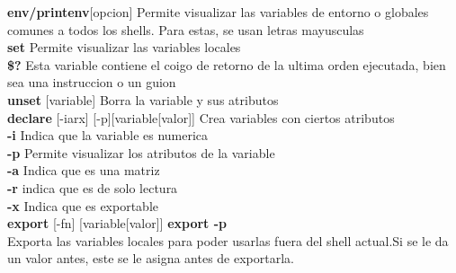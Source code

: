 \documentclass[11pt]{article}
\begin{document}
\textbf{env/printenv}[opcion] \hspace{2cm} Permite visualizar las variables de entorno o globales comunes a todos los shells. Para estas, se usan letras mayusculas\\

\textbf{set} \hspace{2cm} Permite visualizar las variables locales \\




\textbf{\$?} \hspace{2cm} Esta variable contiene el coigo de retorno de la ultima orden ejecutada, bien sea una instruccion o un guion\\

\textbf{unset} [variable]
\hspace{2cm} Borra la variable y sus atributos\\

\textbf{declare} [-iarx] [-p][variable[valor]] \hspace{2cm} Crea variables con ciertos atributos\\

\hspace{2cm} \textbf{-i} \hspace{2cm} Indica que la variable es numerica\\

\hspace{2cm}\textbf{-p} \hspace{2cm} Permite visualizar los atributos de la variable\\

\hspace{2cm}\textbf{-a}\hspace{2cm} Indica que es una matriz\\

\hspace{2cm}\textbf{-r}\hspace{2cm} indica que es de solo lectura\\

\hspace{2cm}\textbf{-x}\hspace{2cm} Indica que es exportable\\


\textbf{export} [-fn] [variable[valor]] 
\hspace{2cm}\textbf{export -p }\\
Exporta las variables locales para poder usarlas fuera del shell actual.Si se le da un valor antes, este se le asigna antes de exportarla.\\
\end{document}
